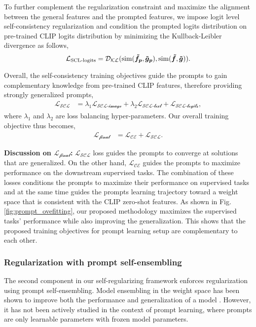 \documentclass[10pt,twocolumn,letterpaper]{article}
\begin{document}
To further complement the regularization constraint and maximize the alignment between the general features and the prompted features, we impose logit level self-consistency regularization and condition the prompted logits distribution on pre-trained CLIP logits distribution by minimizing the Kullback-Leibler divergence as follows,
\begin{align}
\label{eq:scl-logits}
    \mathcal{L_{\text{SCL-logits}}} = \mathcal{D_{KL}} (\text{sim}(\bm{\Tilde{f}_p},\bm{\Tilde{g}_{p}}), {\text{sim}(\bm{\Tilde{f}},\bm{\Tilde{g}}))}.
\end{align}

Overall, the self-consistency training objectives guide the prompts to gain complementary  knowledge from pre-trained CLIP features, therefore providing strongly generalized prompts,
\begin{align}
\label{eq:scl-combined}
    \mathcal{L_{\text{SCL}}} &= \lambda_{1}\mathcal{L_{\text{SCL-image}}} + \lambda_{2}\mathcal{L_{\text{SCL-text}}} + \mathcal{L_{\text{SCL-logits}}},
\end{align}
where $\lambda_{1}$ and $\lambda_{2}$ are loss balancing hyper-parameters. Our overall training objective thus becomes,
\begin{align}
\label{eq:final-loss}
    \mathcal{L_{\text{final}}} &= \mathcal{L_{\text{CE}}} + \mathcal{L_{\text{SCL}}} .
\end{align}

\noindent \textbf{Discussion on $\mathcal{L_{\text{final}}}$:}
$\mathcal{L_{\text{SCL}}}$ loss guides the prompts to converge at solutions that are generalized. On the other hand, $\mathcal{L_{\text{CE}}}$ guides the prompts to maximize performance on the downstream supervised tasks. The combination of these losses conditions the prompts to maximize their performance on supervised tasks and at the same time guides the prompts learning trajectory toward a weight space that is consistent with the CLIP zero-shot features. As shown in Fig. \ref{fig:prompt_ovefitting}, our proposed methodology maximizes the supervised tasks' performance while also improving the generalization. This shows that the proposed training objectives for prompt learning setup are complementary to each other. 

\subsubsection{Regularization with prompt self-ensembling}
\label{GPA_para}
The second component in our self-regularizing framework enforces regularization using prompt self-ensembling. Model ensembling in the weight space has been shown to improve both the performance and generalization of a model \cite{wortsman2022robust, ilharco2022patching}. However, it has not been actively studied in the context of prompt learning, where prompts are only learnable parameters with frozen model parameters. 
\end{document}
